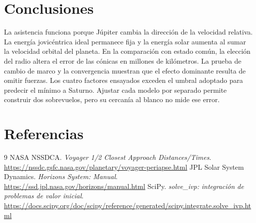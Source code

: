 \documentclass[11pt,letterpaper]{article}
\begin{document}
\section{Conclusiones}
La asistencia funciona porque Júpiter cambia la dirección de la velocidad relativa. La energía jovicéntrica ideal permanece fija y la energía solar aumenta al sumar la velocidad orbital del planeta. En la comparación con estado común, la elección del radio altera el error de las cónicas en millones de kilómetros. La prueba de cambio de marco y la convergencia muestran que el efecto dominante resulta de omitir fuerzas. Los cuatro factores ensayados exceden el umbral adoptado para predecir el mínimo a Saturno. Ajustar cada modelo por separado permite construir dos sobrevuelos, pero su cercanía al blanco no mide ese error.
\renewcommand{\refname}{Referencias}
\section{Referencias}
\begingroup
\makeatletter
\def\section*#1{}
\begin{thebibliography}{9}
 NASA NSSDCA. \emph{Voyager 1/2 Closest Approach Distances/Times}. \url{https://nssdc.gsfc.nasa.gov/planetary/voyager-periapse.html}
 JPL Solar System Dynamics. \emph{Horizons System: Manual}. \url{https://ssd.jpl.nasa.gov/horizons/manual.html}
 SciPy. \emph{solve\_ivp: integración de problemas de valor inicial}. \url{https://docs.scipy.org/doc/scipy/reference/generated/scipy.integrate.solve_ivp.html}
\end{thebibliography}
\makeatother
\endgroup
\end{document}
